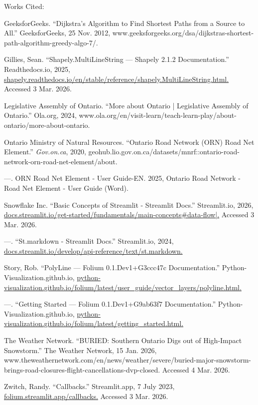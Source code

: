 \documentclass[fontsize=11pt]{article}
\begin{document}
\begin{doublespacing}
\fontsize{12}{16}\selectfont

\begin{center}
Works Cited:
\end{center}
\noindent
\hangindent=0.5in
GeeksforGeeks. “Dijkstra’s Algorithm to Find Shortest Paths from a Source to All.” GeeksforGeeks, 25 Nov. 2012, www.geeksforgeeks.org/dsa/dijkstras-shortest-path-algorithm-greedy-algo-7/.

\noindent
\hangindent=0.5in
Gillies, Sean. “Shapely.MultiLineString — Shapely 2.1.2 Documentation.” Readthedocs.io, 2025, \url{shapely.readthedocs.io/en/stable/reference/shapely.MultiLineString.html.} Accessed 3 Mar. 2026.

\noindent
\hangindent=0.5in
Legislative Assembly of Ontario. “More about Ontario | Legislative Assembly of Ontario.” Ola.org, 2024, www.ola.org/en/visit-learn/teach-learn-play/about-ontario/more-about-ontario.

\noindent
\hangindent=0.5in
Ontario Ministry of Natural Resources. “Ontario Road Network (ORN) Road Net Element.” \textit{Gov.on.ca}, 2020, geohub.lio.gov.on.ca/datasets/mnrf::ontario-road-network-orn-road-net-element/about.

\noindent
\hangindent=0.5in
---. ORN Road Net Element - User Guide-EN. 2025, Ontario Road Network - Road Net Element - User Guide (Word).

\noindent
\hangindent=0.5in
Snowflake Inc. “Basic Concepts of Streamlit - Streamlit Docs.” Streamlit.io, 2026, \url{docs.streamlit.io/get-started/fundamentals/main-concepts\#data-flow|.} Accessed 3 Mar. 2026.

\noindent
\hangindent=0.5in
---. “St.markdown - Streamlit Docs.” Streamlit.io, 2024, \url{docs.streamlit.io/develop/api-reference/text/st.markdown.}

\noindent
\hangindent=0.5in
Story, Rob. “PolyLine — Folium 0.1.Dev1+G3ccc47c Documentation.” Python-Visualization.github.io, \url{python-visualization.github.io/folium/latest/user\_guide/vector\_layers/polyline.html.}

\noindent
\hangindent=0.5in
---. “Getting Started — Folium 0.1.Dev1+G9ab63f7 Documentation.” Python-Visualization.github.io, \url{python-visualization.github.io/folium/latest/getting\_started.html.}

\noindent
\hangindent=0.5in
The Weather Network. “BURIED: Southern Ontario Digs out of High-Impact Snowstorm.” The Weather Network, 15 Jan. 2026, www.theweathernetwork.com/en/news/weather/severe/buried-major-snowstorm-brings-road-closures-flight-cancellations-dvp-closed. Accessed 4 Mar. 2026.

\noindent
\hangindent=0.5in
Zwitch, Randy. “Callbacks.” Streamlit.app, 7 July 2023, \url{folium.streamlit.app/callbacks.} Accessed 3 Mar. 2026.

\end{doublespacing}
\end{document}
